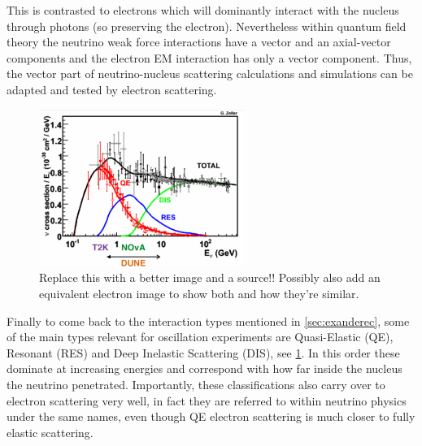 \documentclass[a4paper,12pt]{article}
\begin{document}
This is contrasted to electrons which will dominantly interact with the nucleus through photons (so preserving the electron).
Nevertheless within quantum field theory the neutrino weak force interactions have a vector and an axial-vector components and the electron EM interaction has only a vector component\cite{alvarez-rusoNuSTEC11NeutrinoScattering2018}.
Thus, the vector part of neutrino-nucleus scattering calculations and simulations can be adapted and tested by electron scattering.


\begin{figure}[H]
    \centering
    \includegraphics[width=0.6\textwidth]{figures/sigmaVsEnu.pdf}
    \caption{
        Replace this with a better image and a source!! Possibly also add an equivalent electron image to show both and how they're similar.
    }\label{fig:nusigma_vs_Enu}
\end{figure}

Finally to come back to the interaction types mentioned in \cref{sec:exanderec}, some of the main types relevant for oscillation experiments are Quasi-Elastic (QE), Resonant (RES) and Deep Inelastic Scattering (DIS), see \cref{fig:nusigma_vs_Enu}.
In this order these dominate at increasing energies and correspond with how far inside the nucleus the neutrino penetrated.
Importantly, these classifications also carry over to electron scattering very well, in fact they are referred to within neutrino physics under the same names, even though QE electron scattering is much closer to fully elastic scattering.
\end{document}
